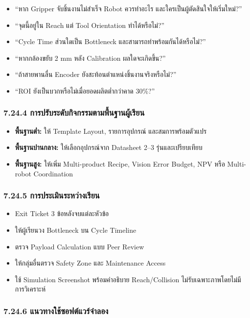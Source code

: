 \begin{itemize}
    \item “หาก Gripper จับชิ้นงานไม่สำเร็จ Robot ควรทำอะไร และใครเป็นผู้ตัดสินใจให้เริ่มใหม่?”
    \item “จุดนี้อยู่ใน Reach แต่ Tool Orientation ทำได้หรือไม่?”
    \item “Cycle Time ส่วนใดเป็น Bottleneck และสามารถทำพร้อมกันได้หรือไม่?”
    \item “หากกล้องขยับ 2 mm หลัง Calibration ผลใดจะเกิดขึ้น?”
    \item “ถ้าสายพานลื่น Encoder ยังสะท้อนตำแหน่งชิ้นงานจริงหรือไม่?”
    \item “ROI ยังเป็นบวกหรือไม่เมื่อยอดผลิตต่ำกว่าคาด 30\%?”
\end{itemize}

\subsubsection{7.24.4 การปรับระดับกิจกรรมตามพื้นฐานผู้เรียน}

\begin{itemize}
    \item \textbf{พื้นฐานต่ำ:} ให้ Template Layout, รายการอุปกรณ์ และสมการพร้อมตัวแปร
    \item \textbf{พื้นฐานปานกลาง:} ให้เลือกอุปกรณ์จาก Datasheet 2–3 รุ่นและเปรียบเทียบ
    \item \textbf{พื้นฐานสูง:} ให้เพิ่ม Multi-product Recipe, Vision Error Budget, NPV หรือ Multi-robot Coordination
\end{itemize}

\subsubsection{7.24.5 การประเมินระหว่างเรียน}

\begin{itemize}
    \item Exit Ticket 3 ข้อหลังจบแต่ละหัวข้อ
    \item ให้ผู้เรียนวง Bottleneck บน Cycle Timeline
    \item ตรวจ Payload Calculation แบบ Peer Review
    \item ให้กลุ่มอื่นตรวจ Safety Zone และ Maintenance Access
    \item ใช้ Simulation Screenshot พร้อมคำอธิบาย Reach/Collision ไม่รับเฉพาะภาพโดยไม่มีการวิเคราะห์
\end{itemize}

\subsubsection{7.24.6 แนวทางใช้ซอฟต์แวร์จำลอง}

